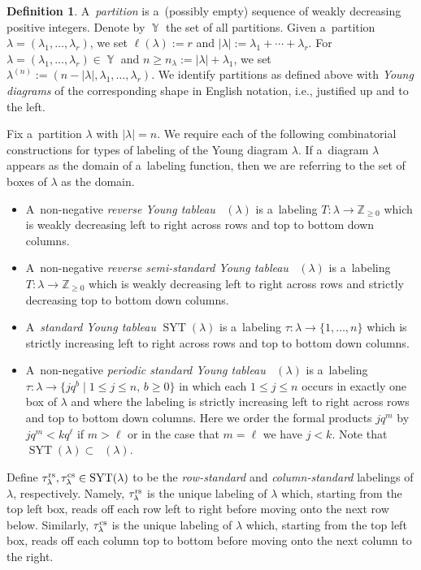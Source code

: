 \documentclass[10pt,a4paper]{amsart}
\numberwithin{equation}{section}
\theoremstyle{definition}
\newtheorem{Definition}[Theorem]{Definition}
\DeclareMathOperator{\Par}{\mathbb{Y}}
\DeclareMathOperator{\RYT}{\mathrm{RYT}_{\geq 0}}
\DeclareMathOperator{\SYT}{\mathrm{SYT}}
\DeclareMathOperator{\PSYT}{\mathrm{PSYT}_{\geq 0}}
\DeclareMathOperator{\RSSYT}{\mathrm{RSSYT}_{\geq 0}}
\begin{document}
\begin{Definition}\label{Tableaux defs}
 A~\textit{partition} is a~(possibly empty) sequence of weakly decreasing positive integers. Denote by $\Par$ the set of all partitions. Given a~partition $\lambda = (\lambda_1,\dots, \lambda_r)$, we set $\ell(\lambda) := r$ and $|\lambda| := \lambda_1 + \cdots + \lambda_r$. For $\lambda = (\lambda_1,\dots, \lambda_r) \in \Par$ and $n \geq n_{\lambda}:= |\lambda| + \lambda_1$, we set $\lambda^{(n)}:= (n -|\lambda|, \lambda_1,\dots, \lambda_r)$. We identify partitions as defined above with \textit{Young diagrams} of the corresponding shape in English notation, i.e., justified up and to the left.

 Fix a~partition $\lambda$ with $|\lambda| = n$. We require each of the following combinatorial constructions for types of labeling of the Young diagram $\lambda$. If a~diagram $\lambda$ appears as the domain of a~labeling function, then we are referring to the set of boxes of $\lambda$ as the domain.
\begin{itemize}\itemsep=0pt
 \item A~non-negative \textit{reverse Young tableau} $\RYT(\lambda)$ is a~labeling $T\colon \lambda \rightarrow \mathbb{Z}_{\geq 0}$ which is weakly decreasing left to right across rows and top to bottom down columns.
 \item A~non-negative \textit{reverse semi-standard Young tableau} $\RSSYT(\lambda)$ is a~labeling $T\colon \lambda \rightarrow \mathbb{Z}_{\geq 0}$ which is weakly decreasing left to right across rows and strictly decreasing top to bottom down columns.
 \item A~\textit{standard Young tableau} $\SYT(\lambda)$ is a~labeling $\tau\colon \lambda \rightarrow \{1,\dots,n\}$ which is strictly increasing left to right across rows and top to bottom down columns.
 \item A~non-negative \textit{periodic standard Young tableau} $\PSYT(\lambda)$ is a~labeling $\tau\colon \lambda \rightarrow \big\{ jq^{b}\mid 1\leq j \leq n,\, b \geq 0\big\}$ in which each $1\leq j \leq n$ occurs in exactly one box of $\lambda$ and where the labeling is strictly increasing left to right across rows and top to bottom down columns. Here we order the formal products $jq^m$ by $jq^m < kq^{\ell}$ if $m > \ell$ or in the case that $m = \ell$ we have $j < k$. Note that $\SYT(\lambda) \subset \PSYT(\lambda)$.
\end{itemize}

Define $\tau^{\rm rs}_{\lambda}, \tau^{\rm cs}_{\lambda} \in \SYT(\lambda)$ to be the \textit{row-standard} and \textit{column-standard} labelings of $\lambda$, respectively. Namely, $\tau^{\rm rs}_{\lambda}$ is the unique labeling of $\lambda$ which, starting from the top left box, reads off each row left to right before moving onto the next row below. Similarly, $\tau^{\rm cs}_{\lambda}$ is the unique labeling of $\lambda$ which, starting from the top left box, reads off each column top to bottom before moving onto the next column to the right.

\end{Definition}
\end{document}
